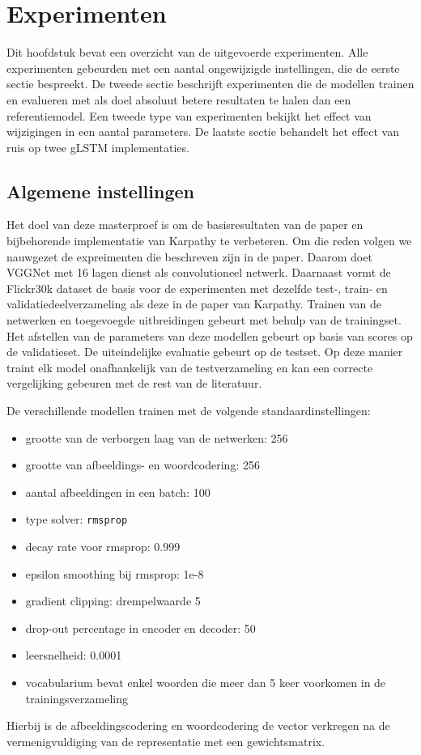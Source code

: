 \chapter{Experimenten} %
\label{cha:experimenten}
Dit hoofdstuk bevat een overzicht van de uitgevoerde experimenten. Alle experimenten gebeurden met een aantal ongewijzigde instellingen, die de eerste sectie bespreekt. De tweede sectie beschrijft experimenten die de modellen trainen en evalueren met als doel absoluut betere resultaten te halen dan een referentiemodel. Een tweede type van experimenten bekijkt het effect van wijzigingen in een aantal parameters. De laatste sectie behandelt het effect van ruis op twee gLSTM implementaties.

\section{Algemene instellingen} %
\label{sec:eigen_implementaties_exp}
Het doel van deze masterproef is om de basisresultaten van de paper en bijbehorende implementatie van Karpathy\cite{Karpathy2015} te verbeteren. Om die reden volgen we nauwgezet de expreimenten die beschreven zijn in de paper. Daarom doet VGGNet met 16 lagen dienst als convolutioneel netwerk. Daarnaast vormt de Flickr30k dataset de basis voor de experimenten met dezelfde test-, train- en validatiedeelverzameling als deze in de paper van Karpathy. Trainen van de netwerken en toegevoegde uitbreidingen gebeurt met behulp van de trainingset. Het afstellen van de parameters van deze modellen gebeurt op basis van scores op de validatieset. De uiteindelijke evaluatie gebeurt op de testset. Op deze manier traint elk model onafhankelijk van de testverzameling en kan een correcte vergelijking gebeuren met de rest van de literatuur.

De verschillende modellen trainen met de volgende standaardinstellingen: 
\begin{itemize}
	\item grootte van de verborgen laag van de netwerken: 256
	\item grootte van afbeeldings- en woordcodering: 256
	\item aantal afbeeldingen in een batch: 100
	\item type solver: \texttt{rmsprop}
	\item decay rate voor rmsprop: 0.999
	\item epsilon smoothing bij rmsprop: 1e-8
	\item gradient clipping: drempelwaarde 5
	\item drop-out percentage in encoder en decoder: 50
	\item leersnelheid: 0.0001
	\item vocabularium bevat enkel woorden die meer dan 5 keer voorkomen in de trainingsverzameling
\end{itemize}Hierbij is de afbeeldingscodering en woordcodering de vector verkregen na de vermenigvuldiging van de representatie met een gewichtsmatrix.

